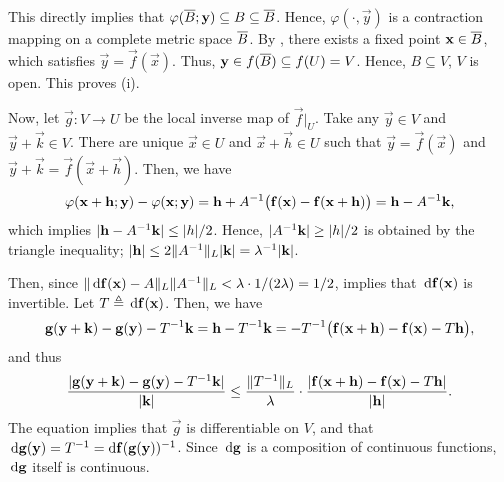 \documentclass[../MAS242_Note.tex]{subfiles}
\begin{document}
{    This directly implies that \(\varphi(\overline B; \mathbf{y}) \subseteq B \subseteq \overline B\).
    Hence, \(\varphi(\cdot, \vec y)\) is a contraction mapping on a complete metric space \(\overline B\).
    By , there exists a fixed point \(\mathbf{x} \in \overline B\),
    which satisfies \(\vec y = \vec f(\vec x)\).
    Thus, \(\mathbf{y} \in f(\overline B) \subseteq f(U) = V\).
    Hence, \(B \subseteq V\), \(V\) is open. This proves (i).

    Now, let \(\vec g \colon V \to U\) be the local inverse map of \(\vec f \big|_U\).
    Take any \(\vec y \in V\) and \(\vec y + \vec k \in V\).
    There are unique \(\vec x \in U\) and \(\vec x + \vec h \in U\) such that
    \(\vec y = \vec f(\vec x)\) and \(\vec y + \vec k = \vec f(\vec x + \vec h)\).
    Then, we have
    \[
        \varphi(\mathbf{x} + \mathbf{h}; \mathbf{y}) - \varphi(\mathbf{x}; \mathbf{y})
        = \mathbf{h} + A^{-1} \big(\mathbf{f}(\mathbf{x}) - \mathbf{f}(\mathbf{x} + \mathbf{h})\big)
        = \mathbf{h} - A^{-1}\mathbf{k}\text{,}
    \]
    which implies \(|\mathbf{h}-A^{-1}\mathbf{k}| \le |h| / 2\).
    Hence, \(|A^{-1} \mathbf{k}| \ge |h| / 2\) is obtained by the triangle inequality;
    \(|\mathbf{h}| \le 2 \|A^{-1}\|_L |\mathbf{k}| = \lambda^{-1} |\mathbf{k}|\).

    Then, since \(\|\,\mathrm{d}\mathbf{f}(\mathbf{x}) - A\|_L \|A^{-1}\|_L < \lambda \cdot 1/(2\lambda) = 1/2\),
     implies that \(\,\mathrm{d}\mathbf{f}(\mathbf{x})\) is invertible.
    Let \(T \triangleq \,\mathrm{d}\mathbf{f}(\mathbf{x})\).
    Then, we have \[
        \mathbf{g}(\mathbf{y} + \mathbf{k}) - \mathbf{g}(\mathbf{y}) - T^{-1}\mathbf{k}
        = \mathbf{h} - T^{-1}\mathbf{k}
        = -T^{-1} \big( \mathbf{f}(\mathbf{x} + \mathbf{h}) - \mathbf{f}(\mathbf{x}) - T\mathbf{h} \big),
    \]
    and thus
    \[
        \frac{|\mathbf{g}(\mathbf{y} + \mathbf{k}) - \mathbf{g}(\mathbf{y}) - T^{-1}\mathbf{k}|}{|\mathbf{k}|}
        \le \frac{\|T^{-1}\|_L}{\lambda} \cdot \frac{|\mathbf{f}(\mathbf{x} + \mathbf{h}) - \mathbf{f}(\mathbf{x}) - T\mathbf{h}|}{|\mathbf{h}|}.
    \]
    The equation implies that \(\vec g\) is differentiable on \(V\),
    and that \(\,\mathrm{d}\mathbf{g}(\mathbf{y}) = T^{-1} = \mathrm{d}\mathbf{f}(\mathbf{g}(\mathbf{y}))^{-1}\).
    Since \(\,\mathrm{d}\mathbf{g}\) is a composition of continuous functions,
    \(\,\mathrm{d}\mathbf{g}\) itself is continuous.
}


\end{document}
